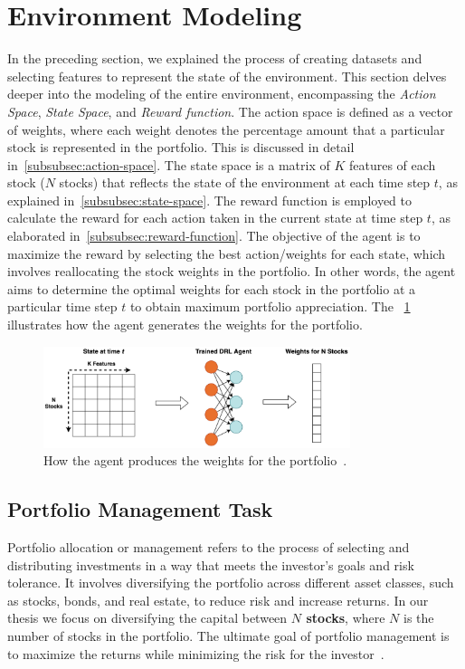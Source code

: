 \documentclass[../xlapes02]{subfiles}
\begin{document}


    \section{Environment Modeling}\label{sec:environment-modeling}
    In the preceding section, we explained the process of creating datasets and selecting features to represent the state of the environment. This section delves deeper into the modeling of the entire environment, encompassing the \emph{Action Space}, \emph{State Space}, and \emph{Reward function}. The action space is defined as a vector of weights, where each weight denotes the percentage amount that a particular stock is represented in the portfolio. This is discussed in detail in~\cref{subsubsec:action-space}. The state space is a matrix of $K$ features of each stock ($N$ stocks) that reflects the state of the environment at each time step $t$, as explained in~\cref{subsubsec:state-space}. The reward function is employed to calculate the reward for each action taken in the current state at time step $t$, as elaborated in~\cref{subsubsec:reward-function}. The objective of the agent is to maximize the reward by selecting the best action/weights for each state, which involves reallocating the stock weights in the portfolio. In other words, the agent aims to determine the optimal weights for each stock in the portfolio at a particular time step $t$ to obtain maximum portfolio appreciation. The ~\cref{fig:state_agent_weights} illustrates how the agent generates the weights for the portfolio.

    \begin{figure}[ht!]
        \centering
        \includegraphics[width=0.8\textwidth]{./image/state_agent_weightss}
        \caption{How the agent produces the weights for the portfolio~\cite{finrl-portfolio-allocation-2020}.}
        \label{fig:state_agent_weights}
    \end{figure}

    \subsection{Portfolio Management Task}\label{subsec:portfolio-management-task}
    Portfolio allocation or management refers to the process of selecting and distributing investments in a way that meets the investor's goals and risk tolerance. It involves diversifying the portfolio across different asset classes, such as stocks, bonds, and real estate, to reduce risk and increase returns. In our thesis we focus on diversifying the capital between \textbf{$N$ stocks}, where $N$ is the number of stocks in the portfolio. The ultimate goal of portfolio management is to maximize the returns while minimizing the risk for the investor~\cite{finrl-portfolio-allocation-2020}.
\end{document}
